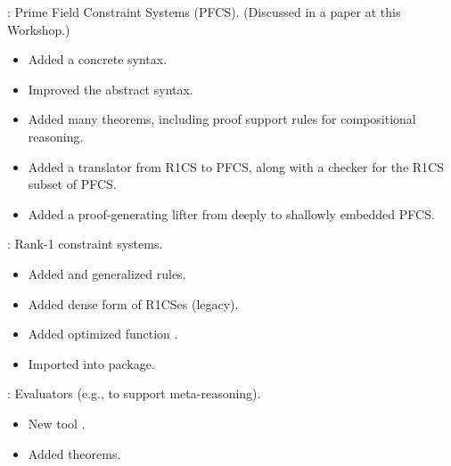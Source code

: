 \begin{frame}

\implibtitle

:
Prime Field Constraint Systems (PFCS).
(Discussed in a paper at this Workshop.)
\begin{itemize}
\item Added a concrete syntax.
\item Improved the abstract syntax.
\item Added many theorems,
      including proof support rules for compositional reasoning.
\item Added a translator from R1CS to PFCS,
      along with a checker for the R1CS subset of PFCS.
\item Added a proof-generating lifter from deeply to shallowly embedded PFCS.
\end{itemize}

\end{frame}


\begin{frame}

\implibtitle

:
Rank-1 constraint systems.
\begin{itemize}
\item Added and generalized rules.
\item Added dense form of R1CSes (legacy).
\item Added optimized function .
\item Imported  into package.
\end{itemize}

\end{frame}


\begin{frame}

\implibtitle

:
Evaluators (e.g., to support meta-reasoning).
\begin{itemize}
\item New tool .
\item Added theorems.
\end{itemize}

\end{frame}

